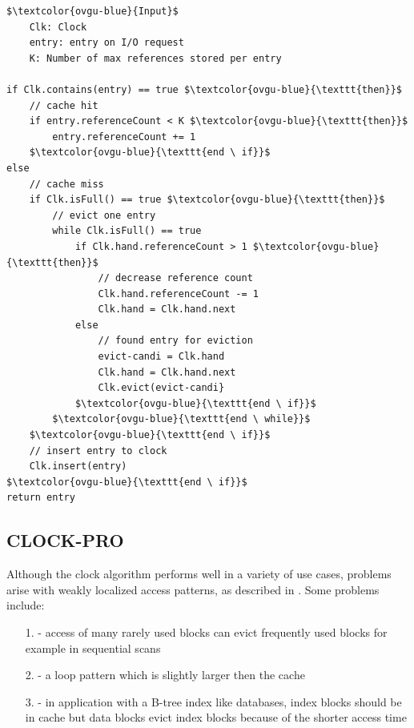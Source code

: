 \documentclass[
	12pt,
	a4paper,
	abstract,
	bibliography=totoc,
	chapterprefix,
	headings=openright,
	numbers=endperiod,
	parskip=half,
	twoside,
]{scrreprt}
\begin{document}
\begin{lstlisting}[mathescape=true,caption=K-Clock replacement algorithm in pseudocode,label=lst:k-clock-algorithm]
$\textcolor{ovgu-blue}{Input}$
	Clk: Clock
	entry: entry on I/O request
	K: Number of max references stored per entry

if Clk.contains(entry) == true $\textcolor{ovgu-blue}{\texttt{then}}$
	// cache hit
	if entry.referenceCount < K $\textcolor{ovgu-blue}{\texttt{then}}$
		entry.referenceCount += 1
	$\textcolor{ovgu-blue}{\texttt{end \ if}}$
else
	// cache miss
	if Clk.isFull() == true $\textcolor{ovgu-blue}{\texttt{then}}$
		// evict one entry
		while Clk.isFull() == true
			if Clk.hand.referenceCount > 1 $\textcolor{ovgu-blue}{\texttt{then}}$
				// decrease reference count 
				Clk.hand.referenceCount -= 1
				Clk.hand = Clk.hand.next
			else
				// found entry for eviction 
				evict-candi = Clk.hand
				Clk.hand = Clk.hand.next
				Clk.evict(evict-candi}
			$\textcolor{ovgu-blue}{\texttt{end \ if}}$
		$\textcolor{ovgu-blue}{\texttt{end \ while}}$
	$\textcolor{ovgu-blue}{\texttt{end \ if}}$
	// insert entry to clock
	Clk.insert(entry)
$\textcolor{ovgu-blue}{\texttt{end \ if}}$
return entry 
\end{lstlisting}

\subsection{CLOCK-PRO}

Although the clock algorithm performs well in a variety of use cases, problems arise with weakly localized access patterns, as described in \cite{jiang2005making}.
Some problems include:
\begin{itemize}
	\item[1.] - access of many rarely used blocks can evict frequently used blocks for example in sequential scans
	\item[2.] - a loop pattern which is slightly larger then the cache 
	\item[3.] - in application with a B-tree index like databases, index blocks should be in cache but data blocks
				evict index blocks because of the shorter access time
\end{itemize}
\end{document}
